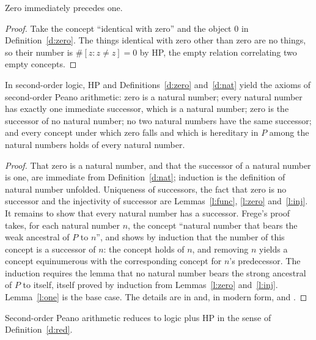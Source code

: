 \documentclass{situationist-preprint}
\begin{document}
\begin{lemma}\label{l:one}
Zero immediately precedes one.
\end{lemma}

\begin{proof}
Take the concept \enquote{identical with zero} and the object $0$ in Definition~\ref{d:zero}. The things identical with zero other than zero are no things, so their number is $\#[z : z \neq z] = 0$ by HP, the empty relation correlating two empty concepts.
\end{proof}

\begin{theorem}\label{t:frege}
In second-order logic, HP and Definitions~\ref{d:zero} and~\ref{d:nat} yield the axioms of second-order Peano arithmetic: zero is a natural number; every natural number has exactly one immediate successor, which is a natural number; zero is the successor of no natural number; no two natural numbers have the same successor; and every concept under which zero falls and which is hereditary in $P$ among the natural numbers holds of every natural number.
\end{theorem}

\begin{proof}
That zero is a natural number, and that the successor of a natural number is one, are immediate from Definition~\ref{d:nat}; induction is the definition of natural number unfolded. Uniqueness of successors, the fact that zero is no successor and the injectivity of successor are Lemmas~\ref{l:func}, \ref{l:zero} and~\ref{l:inj}. It remains to show that every natural number has a successor. Frege's proof takes, for each natural number $n$, the concept \enquote{natural number that bears the weak ancestral of $P$ to $n$}, and shows by induction that the number of this concept is a successor of $n$: the concept holds of $n$, and removing $n$ yields a concept equinumerous with the corresponding concept for $n$'s predecessor. The induction requires the lemma that no natural number bears the strong ancestral of $P$ to itself, itself proved by induction from Lemmas~\ref{l:zero} and~\ref{l:inj}. Lemma~\ref{l:one} is the base case. The details are in \citet{Frege1893} and, in modern form, \citet{Heck1993} and \citet{Boolos1987}.
\end{proof}

\begin{corollary}\label{c:red}
Second-order Peano arithmetic reduces to logic plus HP in the sense of Definition~\ref{d:red}.
\end{corollary}
\end{document}
